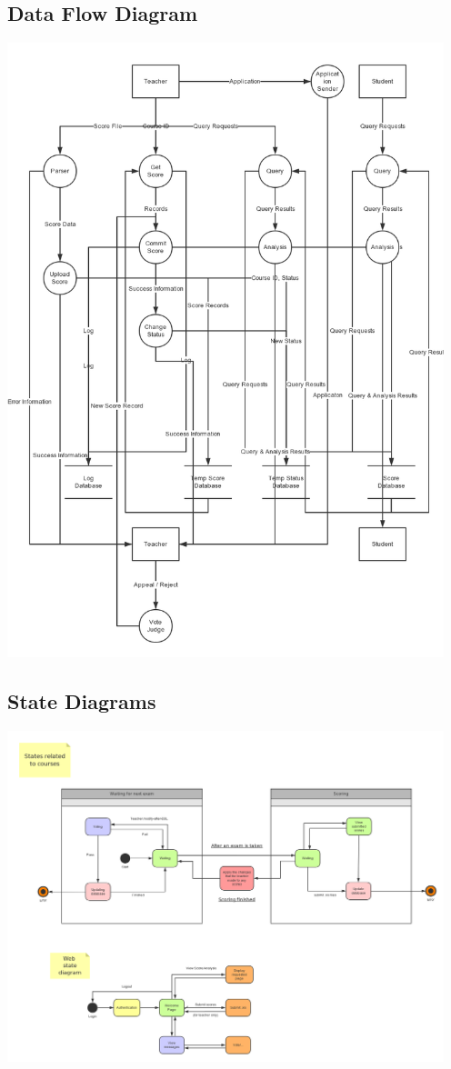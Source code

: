 \documentclass[a4]{article}
\begin{document}
\subsection{Data Flow Diagram}
\includegraphics[width=5in]{pic/2.png}
\subsection{State Diagrams}
\includegraphics[width=5in]{pic/3.png}
\end{document}
